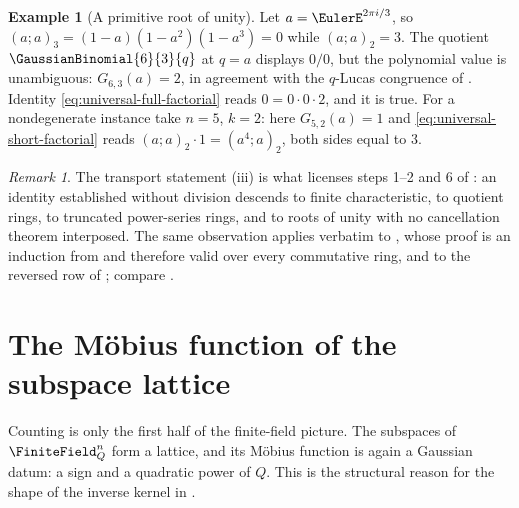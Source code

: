 \documentclass[11pt,a4paper,oneside,openany]{book}
\theoremstyle{definition}
\newtheorem{example}[example]{Example}
\theoremstyle{remark}
\newtheorem{remark}[remark]{Remark}
\begin{document}
\begin{example}[A primitive root of unity]\label{ex:gaussian-root-of-unity}
Let $a=\EulerE^{2\pi i/3}$, so $(a;a)_3=(1-a)(1-a^2)(1-a^3)=0$ while $(a;a)_2=3$.  The quotient $\GaussianBinomial{6}{3}{q}$ at $q=a$ displays $0/0$, but the polynomial value is unambiguous: $G_{6,3}(a)=2$, in agreement with the $q$-Lucas congruence of .  Identity \eqref{eq:universal-full-factorial} reads $0=0\cdot0\cdot2$, and it is true.  For a nondegenerate instance take $n=5$, $k=2$: here $G_{5,2}(a)=1$ and \eqref{eq:universal-short-factorial} reads $(a;a)_2\cdot1=(a^4;a)_2$, both sides equal to $3$.
\end{example}

\begin{remark}
The transport statement (iii) is what licenses steps 1--2 and 6 of : an identity established without division descends to finite characteristic, to quotient rings, to truncated power-series rings, and to roots of unity with no cancellation theorem interposed.  The same observation applies verbatim to , whose proof is an induction from  and therefore valid over every commutative ring, and to the reversed row of ; compare .
\end{remark}



\section{The M\"obius function of the subspace lattice}

Counting is only the first half of the finite-field picture.  The subspaces of $\FiniteField_{Q}^{n}$ form a lattice, and its M\"obius function is again a Gaussian datum: a sign and a quadratic power of $Q$.  This is the structural reason for the shape of the inverse kernel in .
\end{document}
